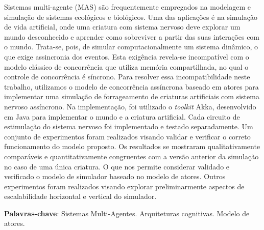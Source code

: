 


\begin{resumo}

Sistemas multi-agente (MAS) são frequentemente empregados na modelagem e simulação de sistemas ecológicos e biológicos. Uma das aplicações é na simulação de vida artificial, onde uma criatura com sistema nervoso deve explorar um mundo desconhecido e aprender como sobreviver a partir das suas interações com o mundo. Trata-se, pois, de simular computacionalmente um sistema dinâmico, o que exige assincronia dos eventos. Esta exigência revela-se incompatível com o modelo clássico de concorrência que utiliza memória compartilhada, no qual o controle de concorrência é síncrono. Para resolver essa incompatibilidade neste trabalho, utilizamos o modelo de concorrência assíncrona baseado em atores para implementar uma simulação de forrageamento de criaturas artificiais com sistema nervoso assíncrono. Na implementação, foi utilizado o \textit{toolkit} Akka, desenvolvido em Java para implementar o mundo e a criatura artificial. Cada circuito de estimulação do sistema nervoso foi implementado e testado separadamente. Um conjunto de experimentos foram realizados visando validar e verificar o correto funcionamento do modelo proposto. Os resultados se mostraram qualitativamente comparáveis e quantitativamente congruentes com a versão anterior da simulação no caso de uma única criatura. O que nos permite considerar validado e verificado o modelo de simulador baseado no modelo de atores. Outros experimentos foram realizados visando explorar preliminarmente aspectos de escalabilidade horizontal e vertical do simulador. 

\begin{comment}
 contexto: simulação de sistemas ecológicos utilizando MAS
 motivação: simular sistemas complexos e de larga escala com plausabilidade biológica
 justificativa: assincronia intrínseca deste tipo de modelo é incompatível com os modelos de programação utilizando memória compartilhada
 objetivo: implementar um simulador escalável utilizando o modelo de atores, bem como um sistema nervoso assíncrono
 metodologia: usar o toolkit akka implementado na linguagem Java para construir o mundo e a criatura artificial, testar os circuitos de estimulação da dinâmica interna, verificar e validar o modela via simulação de forrageamento
 resultado: Escalabilidade. Espera-se fazer as simulações em larga escala e com os resultados compatíveis com a literatura
\end{comment}


\textbf{Palavras-chave}: Sistemas Multi-Agentes. Arquiteturas cognitivas. Modelo de atores.
 

\end{resumo}



